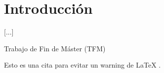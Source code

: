 \section{Introducción} \label{sec:1_introduccion}
[...]


Trabajo de Fin de Máster (TFM) 

Esto es una cita para evitar un warning de LaTeX \cite{pytorch}.
